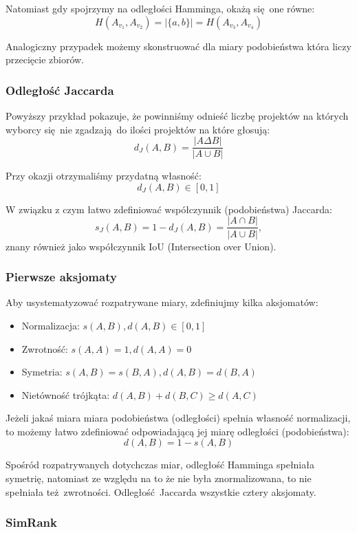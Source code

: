 \documentclass{article}
\begin{document}
Natomiast gdy spojrzymy na odległości Hamminga, okażą się one równe:
\[ H(A_{v_1},A_{v_2}) = |\{a,b\}| = H(A_{v_3},A_{v_4}) \]

Analogiczny przypadek możemy skonstruować dla miary podobieństwa która liczy
przecięcie zbiorów.

\subsubsection{Odległość Jaccarda}

Powyższy przykład pokazuje, że powinniśmy odnieść liczbę projektów na których
wyborcy się nie zgadzają do ilości projektów na które głosują:
\[ d_J(A,B) = \frac{|A \Delta B|}{|A \cup B|} \]

Przy okazji otrzymaliśmy przydatną własność:
\[ d_J(A,B) \in [0, 1] \]

W związku z czym łatwo zdefiniować współczynnik (podobieństwa) Jaccarda:
\[ s_J(A,B) = 1 - d_J(A,B) = \frac{|A \cap B|}{|A \cup B|}, \]
znany również jako współczynnik IoU (Intersection over Union).

\subsubsection*{Pierwsze aksjomaty}

Aby usystematyzować rozpatrywane miary, zdefiniujmy kilka aksjomatów:

\begin{itemize}
  \item Normalizacja: $s(A,B),d(A,B) \in [0, 1]$
  \item Zwrotność: $s(A,A) = 1, d(A,A) = 0$
  \item Symetria: $s(A,B) = s(B,A), d(A,B) = d(B,A)$
  \item Nietówność trójkąta: $d(A,B) + d(B,C) \geq d(A,C)$
\end{itemize}

Jeżeli jakaś miara miara podobieństwa (odległości) spełnia własność
normalizacji, to możemy łatwo zdefiniować odpowiadającą jej miarę odległości
(podobieństwa):
\[ d(A,B) = 1 - s(A,B) \]

Spośród rozpatrywanych dotychczas miar, odległość Hamminga spełniała
symetrię, natomiast ze względu na to że nie była znormalizowana, to nie
spełniała też zwrotności. Odległość Jaccarda wszystkie cztery aksjomaty.

\subsubsection{SimRank}
\end{document}
